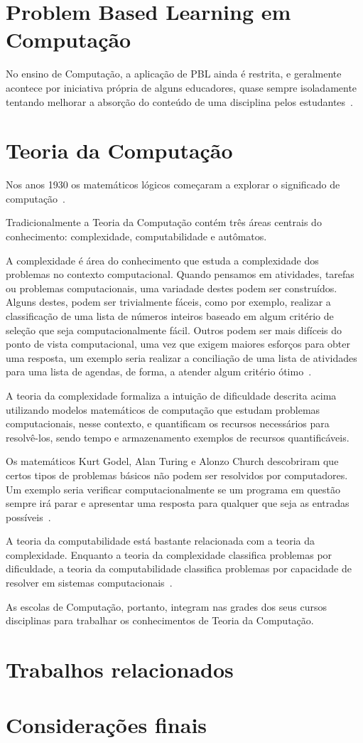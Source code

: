 \section{Problem Based Learning em Computação}
No ensino de Computação, a aplicação de PBL ainda é restrita, e geralmente
acontece por iniciativa própria de alguns educadores,
quase sempre isoladamente tentando melhorar a
absorção do conteúdo de uma disciplina
pelos estudantes~\cite{wood2003problem, o2012practical}.

\section{Teoria da Computação}
Nos anos 1930 os matemáticos lógicos começaram a explorar
o significado de computação~\cite{sipser2006introduction}.

Tradicionalmente a Teoria da Computação contém três áreas centrais
do conhecimento: complexidade, computabilidade e autômatos.

A complexidade é área do conhecimento que estuda a complexidade
dos problemas no contexto computacional.
Quando pensamos em atividades, tarefas ou problemas computacionais,
uma variadade destes podem ser construídos.
Alguns destes, podem ser trivialmente fáceis, como por exemplo,
realizar a classificação de uma lista de números inteiros baseado
em algum critério de seleção que seja computacionalmente fácil.
Outros podem ser mais difíceis do ponto de vista computacional,
uma vez que exigem maiores esforços para obter uma resposta, um exemplo seria
realizar a conciliação de uma lista de atividades para uma lista
de agendas, de forma, a atender algum critério
ótimo~\cite{sipser2006introduction}.

A teoria da complexidade formaliza a intuição de dificuldade descrita acima
utilizando modelos matemáticos de computação que estudam problemas
computacionais, nesse contexto, e quantificam os recursos necessários
para resolvê-los, sendo tempo e armazenamento exemplos de recursos
quantificáveis.

Os matemáticos Kurt Godel, Alan Turing e Alonzo Church descobriram que
certos tipos de problemas básicos não podem ser
resolvidos por computadores.
Um exemplo seria verificar computacionalmente se um programa em questão
sempre irá parar e apresentar uma resposta para qualquer que seja
as entradas possíveis~\cite{sipser2006introduction}.

A teoria da computabilidade está bastante relacionada com a teoria da complexidade.
Enquanto a teoria da complexidade classifica problemas por dificuldade, a teoria
da computabilidade classifica problemas por capacidade de resolver em sistemas
computacionais~\cite{sipser2006introduction}.


As escolas de Computação, portanto, integram nas grades dos seus cursos disciplinas
para trabalhar os conhecimentos de Teoria da Computação.


\section{Trabalhos relacionados}
\section{Considerações finais}
